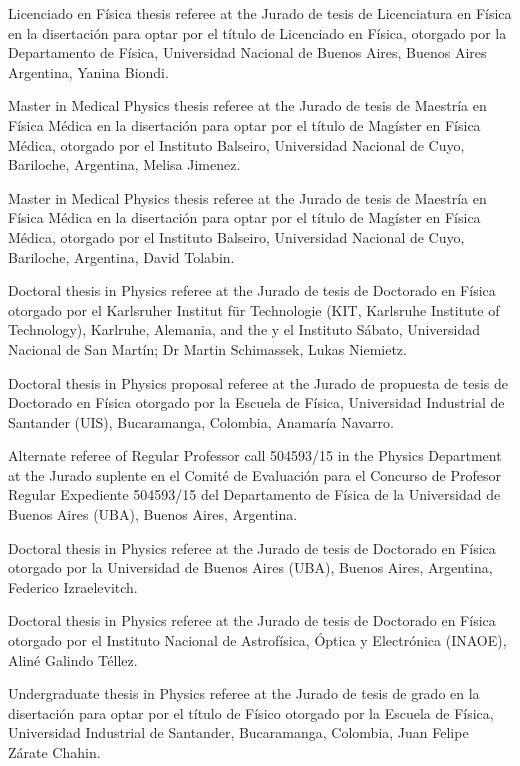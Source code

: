 \ifeng
Licenciado en Física thesis referee at the
\else
Jurado de tesis de Licenciatura en Física en la disertación para optar por el título de Licenciado en Física, otorgado por la 
\fi
Departamento de Física, Universidad Nacional de Buenos Aires, Buenos Aires Argentina, Yanina Biondi.

\ifeng
Master in Medical Physics thesis referee at the
\else
Jurado de tesis de Maestría en Física Médica en la disertación para optar por el título de Magíster en Física Médica, otorgado por el 
\fi
Instituto Balseiro, Universidad Nacional de Cuyo, Bariloche, Argentina, Melisa Jimenez.

\ifeng
Master in Medical Physics thesis referee at the
\else
Jurado de tesis de Maestría en Física Médica en la disertación para optar por el título de Magíster en Física Médica, otorgado por el 
\fi
Instituto Balseiro, Universidad Nacional de Cuyo, Bariloche, Argentina, David Tolabin.

\ifeng
Doctoral thesis in Physics referee at the 
\else
Jurado de tesis de Doctorado en Física otorgado por el 
\fi
Karlsruher Institut für Technologie (KIT, Karlsruhe Institute of Technology), Karlruhe, Alemania, \ifeng and the \else y el \fi Instituto Sábato, Universidad Nacional de San Martín; Dr Martin Schimassek, Lukas Niemietz.

\ifeng
Doctoral thesis in Physics proposal referee at the 
\else
Jurado de propuesta de tesis de Doctorado en Física otorgado por la 
\fi
Escuela de Física, Universidad Industrial de Santander (UIS), Bucaramanga, Colombia, Anamaría Navarro.

\ifeng
Alternate referee of Regular Professor call 504593/15 in the Physics Department at the  
\else
Jurado suplente en el Comité de Evaluación para el Concurso de Profesor Regular Expediente 504593/15 del Departamento de Física de la
\fi
Universidad de Buenos Aires (UBA), Buenos Aires, Argentina.

\ifeng
Doctoral thesis in Physics referee at the 
\else
Jurado de tesis de Doctorado en Física otorgado por la 
\fi
Universidad de Buenos Aires (UBA), Buenos Aires, Argentina, Federico Izraelevitch.

\ifeng
Doctoral thesis in Physics referee at the 
\else
Jurado de tesis de Doctorado en Física otorgado por el 
\fi
Instituto Nacional de Astrofísica, Óptica y Electrónica (INAOE), Aliné Galindo Téllez.

\ifeng
Undergraduate thesis in Physics referee at the  
\else
Jurado de tesis de grado en la disertación para optar por el título de Físico otorgado por la 
\fi
Escuela de Física, Universidad Industrial de Santander, Bucaramanga, Colombia, Juan Felipe Zárate Chahin.

